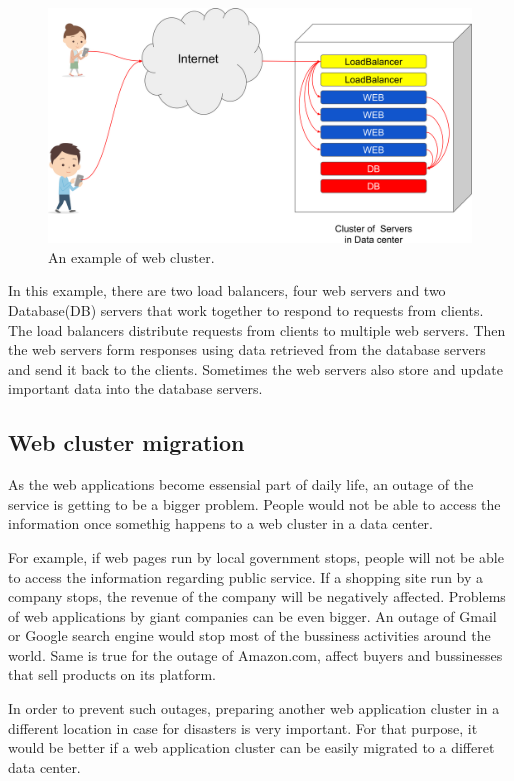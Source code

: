 \begin{figure}[h]
\begin{center}
\includegraphics[width=0.8\columnwidth]{Figs/web_cluster.png}
\end{center}
\caption{
An example of web cluster.
}
\label{fig:web_cluster}
\end{figure}

In this example, there are two load balancers, four web servers and two Database(DB) servers that work together to respond to requests from clients.
The load balancers distribute requests from clients to multiple web servers.
Then the web servers form responses using data retrieved from the database servers and send it back to the clients.
Sometimes the web servers also store and update important data into the database servers.

\subsection{Web cluster migration}

As the web applications become essensial part of daily life, an outage of the service is getting to be a bigger problem.
People would not be able to access the information once somethig happens to a web cluster in a data center.

For example, if web pages run by local government stops, people will not be able to access the information regarding public service.
If a shopping site run by a company stops, the revenue of the company will be negatively affected.
Problems of web applications by giant companies can be even bigger.
An outage of Gmail or Google search engine would stop most of the bussiness activities around the world.
Same is true for the outage of Amazon.com, affect buyers and bussinesses that sell products on its platform.

In order to prevent such outages, preparing another web application cluster in a different location in case for disasters is very important.
For that purpose, it would be better if a web application cluster can be easily migrated to a differet data center.

